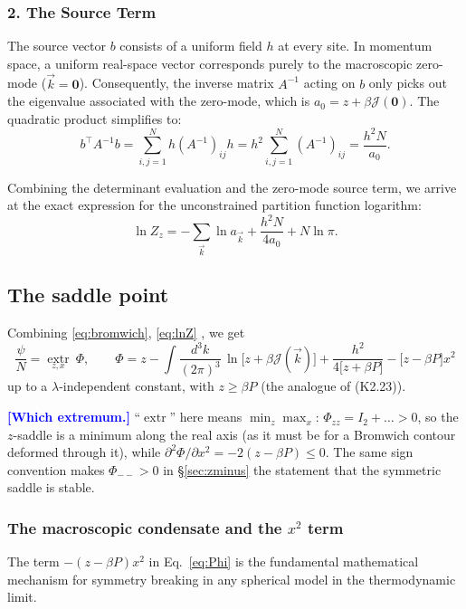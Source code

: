 \documentclass[11pt,a4paper]{article}
\newcommand{\Jc}{\mathcal{J}}
\newcommand{\bk}{\vec k}
\newcommand{\dk}{\frac{d^3k}{(2\pi)^3}}
\newcommand{\FLAG}[1]{\textcolor{blue}{\textbf{[#1]}}}
\newcommand{\Jc}{\mathcal{J}}
\newcommand{\bk}{\vec k}
\newcommand{\dk}{\frac{d^3k}{(2\pi)^3}}
\newcommand{\FLAG}[1]{\textcolor{blue}{\textbf{[#1]}}}
\begin{document}
\subsubsection*{2. The Source Term}
The source vector $b$ consists of a uniform field $h$ at every site. In momentum space, a uniform real-space vector corresponds purely to the macroscopic zero-mode ($\bk = \mathbf{0}$). Consequently, the inverse matrix $A^{-1}$ acting on $b$ only picks out the eigenvalue associated with the zero-mode, which is $a_0 = z + \beta \Jc(\mathbf{0})$. The quadratic product simplifies to:
\begin{equation}
  b^\top A^{-1} b = \sum_{i,j=1}^N h (A^{-1})_{ij} h = h^2 \sum_{i,j=1}^N (A^{-1})_{ij} = \frac{h^2 N}{a_0}.
\end{equation}

Combining the determinant evaluation and the zero-mode source term, we arrive at the exact expression for the unconstrained partition function logarithm:
\begin{equation}
  \ln Z_z = -\sum_{\bk}\ln a_{\bk} + \frac{h^2 N}{4a_0} + N\ln\pi .
  \label{eq:lnZ}
\end{equation}
\subsection{The saddle point}
\label{sec:saddle}
Combining \eqref{eq:bromwich}, \eqref{eq:lnZ} , we get
\begin{equation}
  \boxed{\;
  \frac{\psi}{N}=\operatorname*{extr}_{z,x}\ \Phi,
  \qquad
  \Phi=z-\int\!\dk\,\ln\big[z+\beta\Jc(\bk)\big]
       +\frac{h^2}{4\big[z+\beta P\big]}
       -\big[z-\beta P\big]x^2 \;}
  \label{eq:Phi}
\end{equation}
up to a $\lambda$-independent constant, with $z\geq\beta P$ (the analogue of (K2.23)).

\FLAG{Which extremum.} ``$\operatorname{extr}$'' here means $\min_z\max_x$:
$\Phi_{zz}=I_2+\ldots>0$, so the $z$-saddle is a minimum along the real axis (as it must be
for a Bromwich contour deformed through it), while
$\partial^2\Phi/\partial x^2=-2(z-\beta P)\leq0$. The same sign convention makes
$\Phi_{--}>0$ in \S\ref{sec:zminus} the statement that the symmetric saddle is stable.

\subsubsection{The macroscopic condensate and the $x^2$ term}
\label{sec:condensate}
The term $-(z-\beta P)x^2$ in Eq.~\eqref{eq:Phi} is the fundamental mathematical mechanism for symmetry breaking in any spherical model in the thermodynamic limit.
\end{document}
